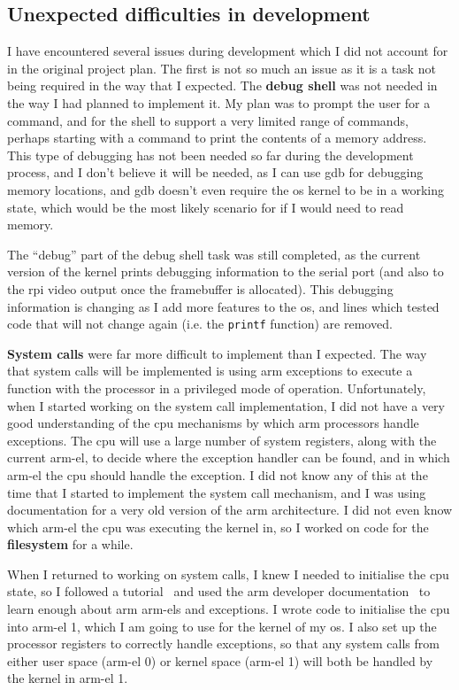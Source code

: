 \documentclass{article}
\begin{document}
\subsection{Unexpected difficulties in development}
I have encountered several issues during development which I did not account
for in the original project plan. The first is not so much an issue as it is a
task not being required in the way that I expected. The \textbf{debug shell}
was not needed in the way I had planned to implement it. My plan was to prompt
the user for a command, and for the shell to support a very limited range of
commands, perhaps starting with a command to print the contents of a memory
address. This type of debugging has not been needed so far during the
development process, and I don't believe it will be needed, as I can use
\gls{gdb} for debugging memory locations, and \gls{gdb} doesn't even require
the \gls{os} kernel to be in a working state, which would be the most likely
scenario for if I would need to read memory.

The ``debug'' part of the debug shell task was still completed, as the current
version of the kernel prints debugging information to the serial port (and also
to the \gls{rpi} video output once the framebuffer is allocated). This
debugging information is changing as I add more features to the \gls{os}, and
lines which tested code that will not change again (i.e. the \texttt{printf}
function) are removed.

\textbf{System calls} were far more difficult to implement than I expected. The
way that system calls will be implemented is using \gls{arm} exceptions
to execute a function with the processor in a privileged mode of operation.
Unfortunately, when I started working on the system call implementation, I did
not have a very good understanding of the \gls{cpu} mechanisms by which
\gls{arm} processors handle exceptions. The \gls{cpu} will use a large number
of system registers, along with the current \gls{arm-el}, to decide where the
exception handler can be found, and in which \gls{arm-el} the \gls{cpu} should
handle the exception. I did not know any of this at the time that I started to
implement the system call mechanism, and I was using documentation for a very
old version of the \gls{arm} architecture. I did not even know which
\gls{arm-el} the \gls{cpu} was executing the kernel in, so I worked on code for
the \textbf{filesystem} for a while.

When I returned to working on system calls, I knew I needed to initialise the
\gls{cpu} state, so I followed a tutorial~\cite{raspberry-pi-os-gh} and used
the \gls{arm} developer documentation~\cite{arm-developer-regs} to learn enough
about \gls{arm} \glspl{arm-el} and exceptions. I wrote code to initialise the
\gls{cpu} into \gls{arm-el} 1, which I am going to use for the kernel of my
\gls{os}. I also set up the processor registers to correctly handle exceptions,
so that any system calls from either user space (\gls{arm-el} 0) or kernel
space (\gls{arm-el} 1) will both be handled by the kernel in \gls{arm-el} 1.
\end{document}
